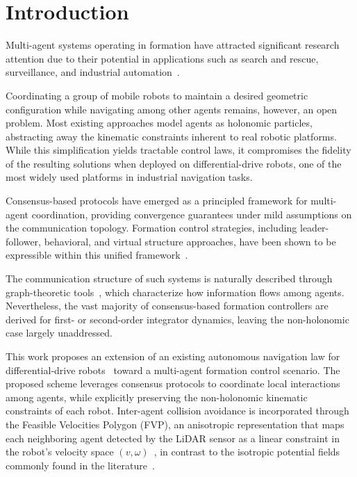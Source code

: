 \section{Introduction}

Multi-agent systems operating in formation have attracted significant research attention due to their potential in applications such as search and rescue, surveillance, and industrial automation~\cite{chen2023survey}.

Coordinating a group of mobile robots to maintain a desired geometric configuration while navigating among other agents remains, however, an open problem. Most existing approaches model agents as holonomic particles, abstracting away the kinematic constraints inherent to real robotic platforms. While this simplification yields tractable control laws, it compromises the fidelity of the resulting solutions when deployed on differential-drive robots, one of the most widely used platforms in industrial navigation tasks.

Consensus-based protocols have emerged as a principled framework for multi-agent coordination, providing convergence guarantees under mild assumptions on the communication topology. Formation control strategies, including leader-follower, behavioral, and virtual structure approaches, have been shown to be expressible within this unified framework~\cite{ren2006consensus}. 

The communication structure of such systems is naturally described through graph-theoretic tools~\cite{mesbahi2010graph}, which characterize how information flows among agents. Nevertheless, the vast majority of consensus-based formation controllers are derived for first- or second-order integrator dynamics, leaving the non-holonomic case largely unaddressed.

This work proposes an extension of an existing autonomous navigation law for differential-drive robots~\cite{ramirez2001collision} toward a multi-agent formation control scenario. The proposed scheme leverages consensus protocols to coordinate local interactions among agents, while explicitly preserving the non-holonomic kinematic constraints of each robot. Inter-agent collision avoidance is incorporated through the Feasible Velocities Polygon (FVP), an anisotropic representation that maps each neighboring agent detected by the LiDAR sensor as a linear constraint in the robot's velocity space $(v, \omega)$~\cite{ramirez2001collision}, in contrast to the isotropic potential fields commonly found in the literature~\cite{khatib1986realtime}.
